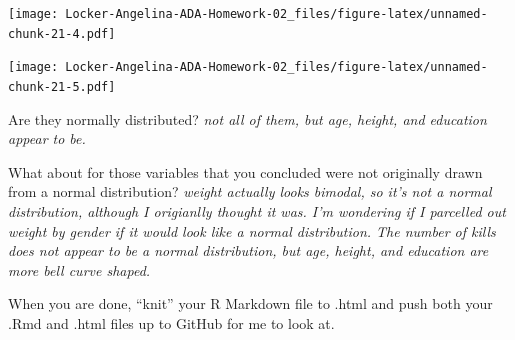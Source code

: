 \documentclass[]{article}
\newenvironment{Shaded}{\begin{snugshade}}{\end{snugshade}}
\newcommand{\KeywordTok}[1]{\textcolor[rgb]{0.13,0.29,0.53}{\textbf{#1}}}
\newcommand{\DataTypeTok}[1]{\textcolor[rgb]{0.13,0.29,0.53}{#1}}
\newcommand{\StringTok}[1]{\textcolor[rgb]{0.31,0.60,0.02}{#1}}
\newcommand{\OperatorTok}[1]{\textcolor[rgb]{0.81,0.36,0.00}{\textbf{#1}}}
\newcommand{\NormalTok}[1]{#1}
\begin{document}
\texttt{[image: Locker-Angelina-ADA-Homework-02\_files/figure-latex/unnamed-chunk-21-4.pdf]}

\begin{Shaded}
\end{Shaded}

\texttt{[image: Locker-Angelina-ADA-Homework-02\_files/figure-latex/unnamed-chunk-21-5.pdf]}

Are they normally distributed? \emph{not all of them, but age, height,
and education appear to be.}

What about for those variables that you concluded were not originally
drawn from a normal distribution? \emph{weight actually looks bimodal,
so it's not a normal distribution, although I origianlly thought it was.
I'm wondering if I parcelled out weight by gender if it would look like
a normal distribution. The number of kills does not appear to be a
normal distribution, but age, height, and education are more bell curve
shaped.}

When you are done, ``knit'' your R Markdown file to .html and push both
your .Rmd and .html files up to GitHub for me to look at.
\end{document}
